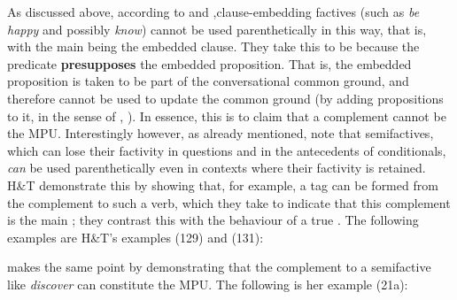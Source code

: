 \documentclass[output=paper]{langsci/langscibook}
\begin{document}
As discussed above, according to \citet{HooperThompson1973} and \citet{Hooper1975},\linebreak clause-embedding factives (such as \textit{be happy} and possibly \textit{know}) cannot be used parenthetically in this way,  that is, with the main  being the embedded clause. They take this to be because the  predicate \textbf{presupposes} the embedded proposition. That is, the embedded proposition is taken to be part of the conversational common ground, and therefore cannot be used to update the common ground (by adding propositions to it, in the sense of  \citealt{Stalnaker1974}, \citeyear{Stalnaker2002}). In essence, this is to claim that a  complement cannot be the MPU. Interestingly however, as already mentioned, \citet{HooperThompson1973} note that semifactives, which can lose their factivity in questions and in the antecedents of conditionals, \textit{can} be used parenthetically even in contexts where their factivity is retained.  H\&T demonstrate this by showing that, for example, a tag  can be formed from the complement to such a verb, which they take to indicate that this complement is the main ; they contrast this with the behaviour of a true . The following examples are H\&T's examples (129) and (131): %

	

\noindent \cite{Simons2007} makes the same point by demonstrating that the complement to a semifactive like \textit{discover} can constitute the MPU. The following is her example (21a): %
\end{document}
